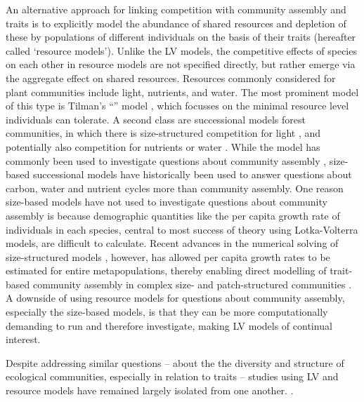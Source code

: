 \documentclass[a4paper,11pt]{article}
\newcommand{\verify}[1]{{\color{navy}{(verify: #1)}}}
\newcommand{\todo}[1]{{\color{navy}{(todo: #1)}}}
\begin{document}
An alternative approach for linking competition with community assembly and traits is to explicitly model the abundance of shared resources and depletion of these by populations of different individuals on the basis of their traits (hereafter called `resource models'). Unlike the LV models, the competitive effects of species on each other in resource models are not specified directly, but rather emerge via the aggregate effect on shared resources. Resources commonly considered for plant communities include light, nutrients, and water. The most prominent model of this type is Tilman's ``\Rstar'' model \citep{Tilman-1977, Tilman-1982}, which focusses on the minimal resource level individuals can tolerate. A second class are successional models forest communities, in which there is size-structured competition for light \citep{Huston-1987,Kohyama-1993,Moorcroft-2001,Falster-2011}, and potentially also competition for nutrients or water \verify{????, water, eg. farrior}. While the \Rstar model has commonly been used to investigate questions about community assembly \todo{references}, size-based successional models have historically been used to answer questions about carbon, water and nutrient cycles \todo{references} more than community assembly. One reason size-based models have not used to investigate questions about community assembly is because demographic quantities like the per capita growth rate of individuals in each species, central to most success of theory using Lotka-Volterra models, are difficult to calculate. Recent advances in the numerical solving of size-structured models \citep{Falster-2016}, however, has allowed per capita growth rates to be estimated for entire metapopulations, thereby enabling direct modelling of trait-based community assembly in complex size- and patch-structured communities \cite{Falster-2017}. A downside of using resource models for questions about community assembly, especially the size-based models, is that they can be more computationally demanding to run and therefore investigate, making LV models of continual interest.

Despite addressing similar questions -- about the the diversity and structure of ecological communities, especially in relation to traits -- studies using LV and resource models have remained largely isolated from one another. \todo{what about Abrams 2008?}.
\end{document}
